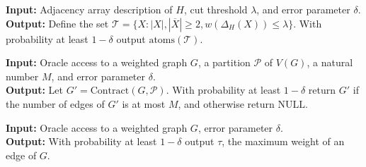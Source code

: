 \documentclass[10pt,a4paper]{article}
\newcommand{\Pcal}{\mathcal{P}}
\newcommand{\Tcal}{\mathcal{T}}
\newcommand{\atoms}{\mathrm{atoms}}
\newcommand{\Contract}{\mathrm{Contract}}
\newcommand{\1}{\mathbf{1}}
\theoremstyle{definition}
\begin{document}
\begin{algorithm}[H]
\caption{LearnCutAtoms$(H,\lambda, \delta)$}
 \hspace*{\algorithmicindent} \textbf{Input:} Adjacency array description of $H$, cut threshold $\lambda$, and error parameter $\delta$. \\
 \hspace*{\algorithmicindent} \textbf{Output:}
 Define the set $\Tcal = \{ X: |X|, |\overline{X}| \ge 2, w(\Delta_H(X)) \le \lambda \}$.
 With probability at least $1-\delta$ output $\atoms(\Tcal)$.
\end{algorithm}

\begin{algorithm}[H]
\caption{LearnContraction$[G](\Pcal, M, \delta)$}
\label{alg:contract}
 \hspace*{\algorithmicindent} \textbf{Input:} Oracle access to a weighted graph $G$, a partition $\Pcal$ of $V(G)$, a natural number $M$, and error parameter $\delta$. \\
 \hspace*{\algorithmicindent} \textbf{Output:} Let $G' = \Contract(G,\Pcal)$.  With probability at least $1-\delta$ return $G'$ if the number of edges of $G'$ is at most $M$, 
 and otherwise return $\mathrm{NULL}$.
\end{algorithm}

\begin{algorithm}[H]
\caption{FindMaxWeight$[G](\delta)$}
\label{alg:maxweight}
 \hspace*{\algorithmicindent} \textbf{Input:} Oracle access to a weighted graph $G$, error parameter $\delta$. \\
 \hspace*{\algorithmicindent} \textbf{Output:} With probability at least $1-\delta$ output $\tau$, the maximum weight of an edge of $G$.
\end{algorithm}
\end{document}
